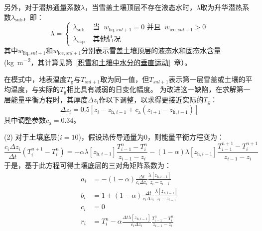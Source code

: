 另外，对于潜热通量系数$\lambda$，当雪盖土壤顶层不存在液态水时，$\lambda$取为升华潜热系数$\lambda_{\mathrm {sub}} $，即：
\begin{equation}
  \lambda=\left\{\begin{array}{lr}\lambda_{\mathrm{sub}} & \text { 当 }\ w_{\mathrm{liq},snl+1}=0 \text { 并且 }\ w_{\mathrm{ice},snl+1}>0 \\ \lambda_{\mathrm{vap}} & \text { 其他情况 }\end{array}\right.
\end{equation}
其中$w_{\mathrm{liq},snl+1}$和$w_{\mathrm{ice},snl+1}$分别表示雪盖土壤顶层的液态水和固态水含量 (\unit{kg.m^{-2}}，其计算见第~\ref{积雪和土壤中水分的垂直运动}~章）。

在模式中，地表温度$T_{\mathrm {g}} $与$T_{snl+1}$取为同一值，但$T_{snl+1}$表示第一层雪盖或土壤的平均温度，与实际的$T_{\mathrm {g}} $相比具有减弱的日变化幅度。 为改进这一缺陷，在求解第一层能量平衡方程时，其厚度$\Delta z_{i} $作以下调整，以求得更接近实际的$T_{\mathrm {g}}$：
\begin{equation}
\Delta z_{i}=0.5\left[z_{i}-z_{\mathrm{h},i-1}+c_{\mathrm{a}}\left(z_{i+1}-z_{\mathrm{h},i-1}\right)\right]
\end{equation}
其中调整参数$c_{\mathrm {a}} =0.34$。

(2) 对于土壤底层($i=10$)，假设热传导通量为0，则能量平衡方程变为：
\begin{equation}
  \frac{c_{i} \Delta z_{i}}{\Delta t}\left(T_{i}^{n+1}-T_{i}^{n}\right)=-\alpha \lambda\left[z_{\mathrm{h},i-1}\right] \frac{T_{i-1}^{n}-T_{i}^{n}}{z_{i-1}-z_{i}}-(1-\alpha) \lambda\left[z_{\mathrm{h},i-1}\right] \frac{T_{i-1}^{n+1}-T_{i}^{n+1}}{z_{i-1}-z_{i}}
\end{equation}
于是，基于此方程可得土壤底层的三对角矩阵系数为：
\begin{equation}
  \begin{aligned}
    a_{i} &= -(1-\alpha) \frac{\Delta t}{c_{i} \Delta z_{i}} \frac{\lambda\left[z_{\mathrm{h},i-1}\right]}{z_{i}-z_{i-1}} \\
    b_{i} &= 1+(1-\alpha) \frac{\Delta t}{c_{i} \Delta z_{i}} \frac{\lambda\left[z_{\mathrm{h},i-1}\right]}{z_{i}-z_{i-1}} \\
    c_{i} &= 0 \\
    r_{i} &= T_{i}^{n}-\alpha \frac{\Delta t \lambda\left[z_{\mathrm{h},i-1}\right]}{c_{i} \Delta z_{i}} \frac{T_{i-1}^{n}-T_{i}^{n}}{z_{i-1}-z_{i}}
  \end{aligned}
\end{equation}

